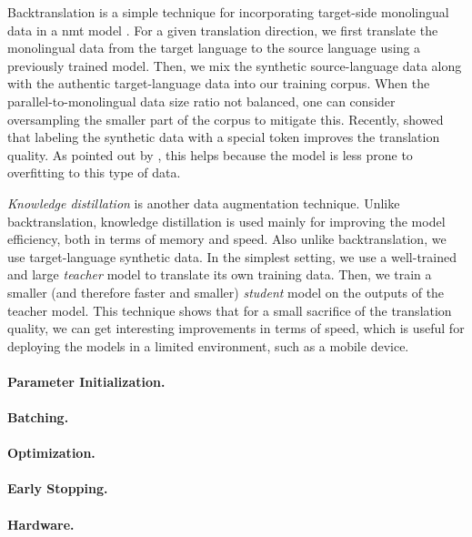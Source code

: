 Backtranslation is a simple technique for incorporating target-side monolingual
data in a \gls{nmt} model \citep{sennrich-etal-2016-improving}. For a given
translation direction, we first translate the monolingual data from the target
language to the source language using a previously trained model. Then, we mix
the synthetic source-language data along with the authentic target-language
data into our training corpus. When the parallel-to-monolingual data size ratio
not balanced, one can consider oversampling the smaller part of the corpus to
mitigate this. Recently, \citet{caswell-etal-2019-tagged} showed that labeling
the synthetic data with a special token improves the translation quality. As
pointed out by \citet{marie-etal-2020-tagged}, this helps because the model is
less prone to overfitting to this type of data.

\emph{Knowledge distillation} \citep{kim-rush-2016-sequence} is another data
augmentation technique. Unlike backtranslation, knowledge distillation is used
mainly for improving the model efficiency, both in terms of memory and speed.
Also unlike backtranslation, we use target-language synthetic data. In the
simplest setting, we use a well-trained and large \emph{teacher} model to
translate its own training data. Then, we train a smaller (and therefore faster
and smaller) \emph{student} model on the outputs of the teacher model. This
technique shows that for a small sacrifice of the translation quality, we can
get interesting improvements in terms of speed, which is useful for deploying
the models in a limited environment, such as a mobile device.

\paragraph{Parameter Initialization.}

\paragraph{Batching.}

\paragraph{Optimization.}

\paragraph{Early Stopping.}


\paragraph{Hardware.}



